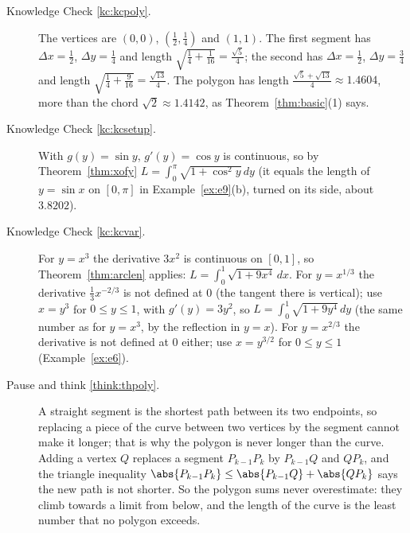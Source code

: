 \documentclass[11pt]{article}
\begin{document}
\begin{description}

  \item[Knowledge Check \ref{kc:kcpoly}.] The vertices are $(0,0)$, $(\frac12,\frac14)$ and $(1,1)$. The first segment has $\Delta x=\frac12$, $\Delta y=\frac14$ and length $\sqrt{\frac14+\frac1{16}}=\frac{\sqrt5}4$; the second has $\Delta x=\frac12$, $\Delta y=\frac34$ and length $\sqrt{\frac14+\frac9{16}}=\frac{\sqrt{13}}4$. The polygon has length $\frac{\sqrt5+\sqrt{13}}4\approx1.4604$, more than the chord $\sqrt2\approx1.4142$, as Theorem~\ref{thm:basic}(1) says.

  \item[Knowledge Check \ref{kc:kcsetup}.] With $g(y)=\sin y$, $g'(y)=\cos y$ is continuous, so by Theorem~\ref{thm:xofy} $L=\int_0^\pi\sqrt{1+\cos^2y}\,dy$ (it equals the length of $y=\sin x$ on $[0,\pi]$ in Example~\ref{ex:e9}(b), turned on its side, about $3.8202$).

  \item[Knowledge Check \ref{kc:kcvar}.] For $y=x^3$ the derivative $3x^2$ is continuous on $[0,1]$, so Theorem~\ref{thm:arclen} applies: $L=\int_0^1\sqrt{1+9x^4}\,dx$. For $y=x^{1/3}$ the derivative $\frac13x^{-2/3}$ is not defined at $0$ (the tangent there is vertical); use $x=y^3$ for $0\le y\le1$, with $g'(y)=3y^2$, so $L=\int_0^1\sqrt{1+9y^4}\,dy$ (the same number as for $y=x^3$, by the reflection in $y=x$). For $y=x^{2/3}$ the derivative is not defined at $0$ either; use $x=y^{3/2}$ for $0\le y\le1$ (Example~\ref{ex:e6}).

  \item[Pause and think \ref{think:thpoly}.] A straight segment is the shortest path between its two endpoints, so replacing a piece of the curve between two vertices by the segment cannot make it longer; that is why the polygon is never longer than the curve. Adding a vertex $Q$ replaces a segment $P_{k-1}P_k$ by $P_{k-1}Q$ and $QP_k$, and the triangle inequality $\abs{P_{k-1}P_k}\le\abs{P_{k-1}Q}+\abs{QP_k}$ says the new path is not shorter. So the polygon sums never overestimate: they climb towards a limit from below, and the length of the curve is the least number that no polygon exceeds.


\end{description}
\end{document}
